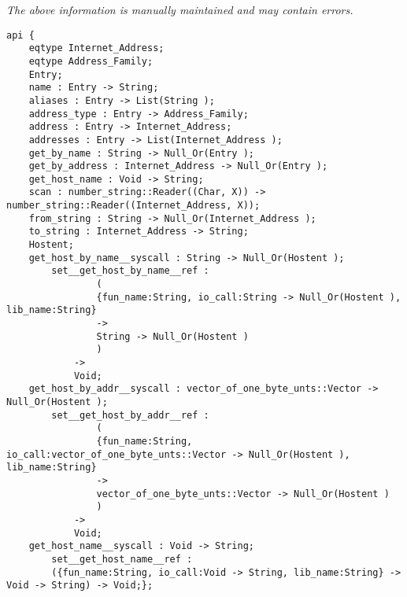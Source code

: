 \label{api:Dns\_Host\_Lookup}

{\tiny \it The above information is manually maintained and may contain errors.}
\begin{verbatim}
api {
    eqtype Internet_Address;
    eqtype Address_Family;
    Entry;
    name : Entry -> String;
    aliases : Entry -> List(String );
    address_type : Entry -> Address_Family;
    address : Entry -> Internet_Address;
    addresses : Entry -> List(Internet_Address );
    get_by_name : String -> Null_Or(Entry );
    get_by_address : Internet_Address -> Null_Or(Entry );
    get_host_name : Void -> String;
    scan : number_string::Reader((Char, X)) -> number_string::Reader((Internet_Address, X));
    from_string : String -> Null_Or(Internet_Address );
    to_string : Internet_Address -> String;
    Hostent;
    get_host_by_name__syscall : String -> Null_Or(Hostent );
        set__get_host_by_name__ref :
                (
                {fun_name:String, io_call:String -> Null_Or(Hostent ), lib_name:String}
                ->
                String -> Null_Or(Hostent )
                )
            ->
            Void;
    get_host_by_addr__syscall : vector_of_one_byte_unts::Vector -> Null_Or(Hostent );
        set__get_host_by_addr__ref :
                (
                {fun_name:String, io_call:vector_of_one_byte_unts::Vector -> Null_Or(Hostent ), lib_name:String}
                ->
                vector_of_one_byte_unts::Vector -> Null_Or(Hostent )
                )
            ->
            Void;
    get_host_name__syscall : Void -> String;
        set__get_host_name__ref :
        ({fun_name:String, io_call:Void -> String, lib_name:String} -> Void -> String) -> Void;};
\end{verbatim}
